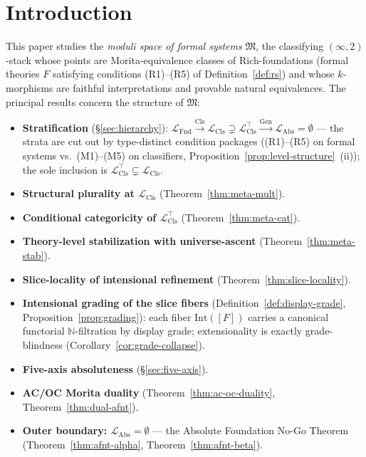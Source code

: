 \documentclass[11pt]{article}
\theoremstyle{plain}
\theoremstyle{definition}
\newcommand{\fM}{\mathfrak{M}}
\newcommand{\LFnd}{\mathcal{L}_{\mathrm{Fnd}}}
\newcommand{\LCls}{\mathcal{L}_{\mathrm{Cls}}}
\newcommand{\LClsMax}{\mathcal{L}_{\mathrm{Cls}}^{\top}}
\newcommand{\LAbs}{\mathcal{L}_{\mathrm{Abs}}}
\begin{document}
\begin{abstract}
\smallskip
\noindent\textbf{Keywords:} moduli space of formal systems, classifying $2$-stacks, categorical logic, $(\infty, n)$-categories, higher topos theory, intensional type theory, meta-classification, effective topos, no-go theorems.

\smallskip
\noindent\textbf{MSC2020:} 03A05, 03B30, 03C45, 03F40, 18A05, 18N10, 18N50, 18N60, 18N65.

\end{abstract}

\newpage
\tableofcontents
\newpage

\section{Introduction}

This paper studies the \emph{moduli space of formal systems} $\fM$, the classifying $(\infty, 2)$-stack whose points are Morita-equivalence classes of Rich-foundations (formal theories $F$ satisfying conditions (R1)--(R5) of Definition~\ref{def:rs}) and whose $k$-morphisms are faithful interpretations and provable natural equivalences. The principal results concern the structure of $\fM$:
\begin{itemize}
\item \textbf{Stratification} (\S\ref{sec:hierarchy}): $\LFnd \xrightarrow{\mathrm{Cls}} \LCls \supsetneq \LClsMax \xrightarrow{\mathrm{Gen}} \LAbs = \emptyset$ --- the strata are cut out by type-distinct condition packages ((R1)--(R5) on formal systems vs.\ (M1)--(M5) on classifiers, Proposition~\ref{prop:level-structure}~(ii)); the sole inclusion is $\LClsMax \subsetneq \LCls$.
\item \textbf{Structural plurality at $\LCls$} (Theorem~\ref{thm:meta-mult}).
\item \textbf{Conditional categoricity of $\LClsMax$} (Theorem~\ref{thm:meta-cat}).
\item \textbf{Theory-level stabilization with universe-ascent} (Theorem~\ref{thm:meta-stab}).
\item \textbf{Slice-locality of intensional refinement} (Theorem~\ref{thm:slice-locality}).
\item \textbf{Intensional grading of the slice fibers} (Definition~\ref{def:display-grade}, Proposition~\ref{prop:grading}): each fiber $\mathrm{Int}([F])$ carries a canonical functorial $\mathbb{N}$-filtration by display grade; extensionality is exactly grade-blindness (Corollary~\ref{cor:grade-collapse}).
\item \textbf{Five-axis absoluteness} (\S\ref{sec:five-axis}).
\item \textbf{AC/OC Morita duality} (Theorem~\ref{thm:ac-oc-duality}, Theorem~\ref{thm:dual-afnt}).
\item \textbf{Outer boundary: $\LAbs = \emptyset$} --- the Absolute Foundation No-Go Theorem (Theorem~\ref{thm:afnt-alpha}, Theorem~\ref{thm:afnt-beta}).
\end{itemize}
\end{document}
